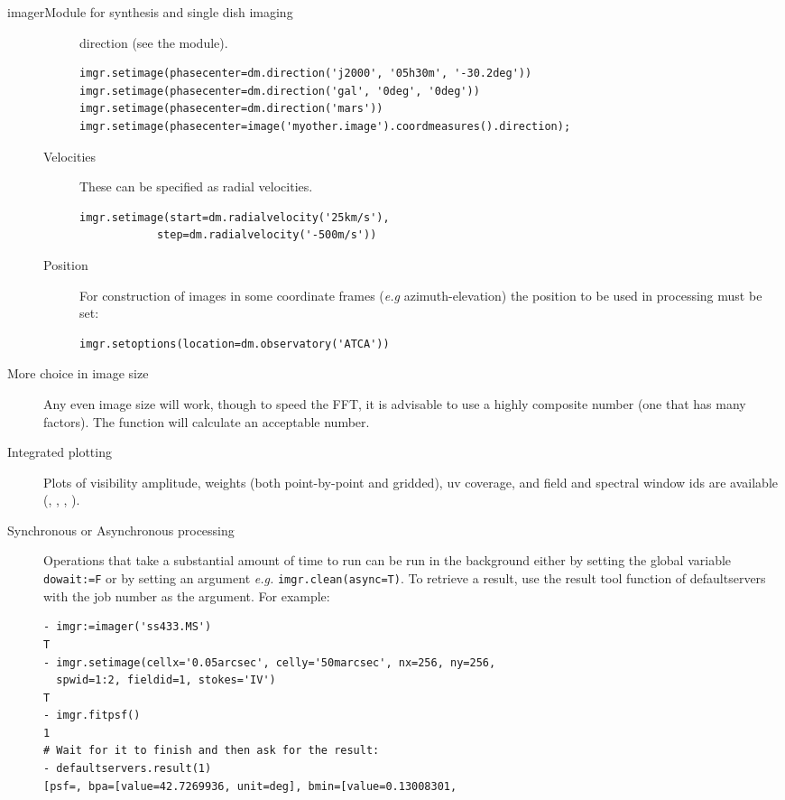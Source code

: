 \begin{ahmodule}{imager}{Module for synthesis and single dish imaging}
\begin{description}
\begin{description}
direction (see the  module).
\begin{verbatim}
imgr.setimage(phasecenter=dm.direction('j2000', '05h30m', '-30.2deg'))
imgr.setimage(phasecenter=dm.direction('gal', '0deg', '0deg'))
imgr.setimage(phasecenter=dm.direction('mars'))
imgr.setimage(phasecenter=image('myother.image').coordmeasures().direction);
\end{verbatim}
\item[Velocities] These can be specified as radial velocities.
\begin{verbatim}
imgr.setimage(start=dm.radialvelocity('25km/s'), 
            step=dm.radialvelocity('-500m/s'))
\end{verbatim}
\item[Position] For construction of images in some coordinate
frames ({\em e.g} azimuth-elevation) the position to be used
in processing must be set:
\begin{verbatim}
imgr.setoptions(location=dm.observatory('ATCA'))
\end{verbatim}
\end{description}
\item[More choice in image size] Any even image size will work,
though to speed the FFT, it is advisable to
use a highly composite number (one that has many factors).
The  function will
calculate an acceptable number.
\item[Integrated plotting] Plots of visibility 
amplitude, weights (both point-by-point and gridded),
uv coverage, and field and spectral window ids are available 
(, 
, 
, 
).
\item[Synchronous or Asynchronous processing] Operations that
take a substantial amount of time to run can be run in the
background either by setting the global variable {\tt dowait:=F}
or by setting an argument {\em e.g.} {\tt imgr.clean(async=T)}.
To retrieve a result, use the result tool function of
defaultservers with the job number as the argument. For example:
\begin{verbatim}
- imgr:=imager('ss433.MS')
T
- imgr.setimage(cellx='0.05arcsec', celly='50marcsec', nx=256, ny=256, 
  spwid=1:2, fieldid=1, stokes='IV') 
T 
- imgr.fitpsf()
1 
# Wait for it to finish and then ask for the result:
- defaultservers.result(1)
[psf=, bpa=[value=42.7269936, unit=deg], bmin=[value=0.13008301, 

\end{verbatim}
\end{description}
\end{ahmodule}
